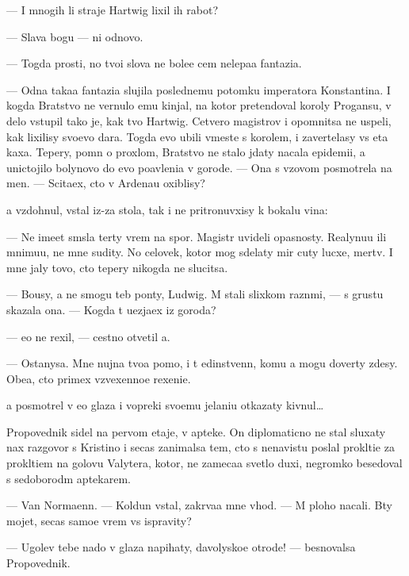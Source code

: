 \documentclass[10pt]{book}
\begin{document}
— I mnogih li straje{\y} Hartwig lixil ih rabot{\yi}?

— Slava bogu — ni odnovo.

— Togda prosti, no tvo{\y}i slova ne bole{\y}e cem nelepa{\y}a fantazi{\y}a.

— Odna taka{\y}a fantazi{\y}a slujila poslednemu potomku imperatora Konstantina. I kogda Bratstvo ne vernulo {\y}emu kinjal, na kotor{\yi}{\y} pretendoval koroly Progansu, v delo vstupil tako{\y} je, kak tvo{\y} Hartwig. Cetvero magistrov i opomnitsa ne uspeli, kak lixilisy svo{\y}evo dara. Togda {\y}evo ubili vmeste s korolem, i zavertelasy vs{\ia} eta kaxa. Tepery, pomn{\ia} o proxlom, Bratstvo ne stalo jdaty nacala epidemi{\y}i, a unictojilo bolynovo do {\y}evo po{\y}avleni{\y}a v gorode. — Ona s v{\yi}zovom posmotrela na men{\ia}. — Scita{\y}ex, cto v Ardenau oxiblisy?

{\Y}a vzdohnul, vstal iz-za stola, tak i ne pritronuvxisy k bokalu vina:

— Ne ime{\y}et sm{\yi}sla ter{\ia}ty vrem{\ia} na spor{\yi}. Magistr{\yi} uvideli opasnosty. Realynu{\y}u ili mnimu{\y}u, ne mne sudity. No celovek, kotor{\yi}{\y} mog sdelaty mir cuty lucxe, mertv. I mne jaly tovo, cto tepery nikogda ne slucitsa.

— Bo{\y}usy, {\y}a ne smogu teb{\ia} pon{\ia}ty, Ludwig. M{\yi} stali slixkom razn{\yi}mi, — s grust{\y}u skazala ona. — Kogda t{\yi} u{\y}ezja{\y}ex iz goroda?

— {\Y}e{\x}o ne rexil, — cestno otvetil {\y}a.

— Ostanysa. Mne nujna tvo{\y}a pomo{\x}, i t{\yi} {\y}edinstvenn{\yi}{\y}, komu {\y}a mogu dover{\ia}ty zdesy. Obe{\x}a{\y}, cto primex vzvexenno{\y}e rexeni{\y}e.

{\Y}a posmotrel v {\y}e{\y}o glaza i vopreki svo{\y}emu jelani{\y}u otkazaty kivnul…

Propovednik sidel na pervom etaje, v apteke. On diplomaticno ne stal sluxaty nax razgovor s Kristino{\y} i se{\y}cas zanimalsa tem, cto s nenavist{\y}u pos{\yi}lal prokl{\ia}ti{\y}e za prokl{\ia}ti{\y}em na golovu Valytera, kotor{\yi}{\y}, ne zameca{\y}a svetlo{\y} duxi, negromko besedoval s sedoborod{\yi}m aptekarem.

— Van Normaenn. — Koldun vstal, zakr{\yi}va{\y}a mne v{\yi}hod. — M{\yi} ploho nacali. B{\yi}ty mojet, se{\y}cas samo{\y}e vrem{\ia} vs{\e} ispravity?

— Ugol{\y}ev tebe nado v glaza napihaty, d{\y}avolysko{\y}e otrod{\y}e! — besnovalsa Propovednik.
\end{document}
